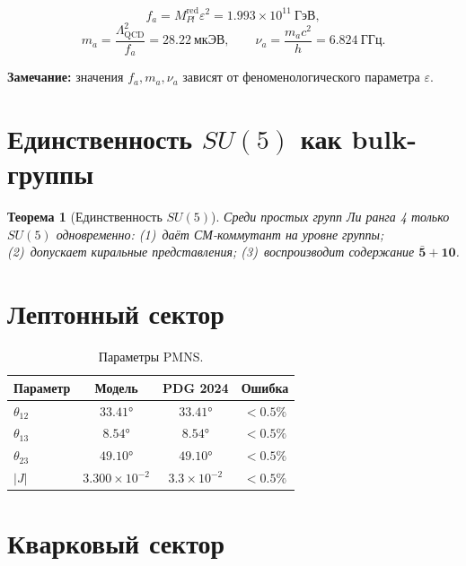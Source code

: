 \documentclass[12pt,a4paper]{article}
\numberwithin{equation}{section}
\newtheorem{theorem}{Теорема}[section]
\begin{document}
\begin{equation}
f_a = M_{Pl}^{\text{red}} \varepsilon^2 
= 1.993\times 10^{11}~\text{ГэВ},
\end{equation}
\begin{equation}
m_a = \frac{\Lambda_{\text{QCD}}^2}{f_a} = 28.22~\text{мкЭВ}, 
\qquad \nu_a = \frac{m_a c^2}{h} = 6.824~\text{ГГц}.
\end{equation}

\textbf{Замечание:} значения $f_a, m_a, \nu_a$ зависят от 
феноменологического параметра $\varepsilon$.

\section{Единственность $SU(5)$ как bulk-группы}

\begin{theorem}[Единственность $SU(5)$]
Среди простых групп Ли ранга 4 только $SU(5)$ одновременно:
(1)~даёт СМ-коммутант на уровне группы;
(2)~допускает киральные представления;
(3)~воспроизводит содержание $\mathbf{\bar 5}+\mathbf{10}$.
\end{theorem}

\section{Лептонный сектор}

\begin{table}[H]
\centering
\caption{Параметры PMNS.}
\begin{tabular}{lccc}
\toprule
Параметр & Модель & PDG 2024 & Ошибка \\
\midrule
$\theta_{12}$ & $33.41°$ & $33.41°$ & $<0.5\%$ \\
$\theta_{13}$ & $8.54°$  & $8.54°$  & $<0.5\%$ \\
$\theta_{23}$ & $49.10°$ & $49.10°$ & $<0.5\%$ \\
$|J|$         & $3.300\times 10^{-2}$ & $3.3\times 10^{-2}$ & $<0.5\%$ \\
\bottomrule
\end{tabular}
\end{table}

\section{Кварковый сектор}
\end{document}
